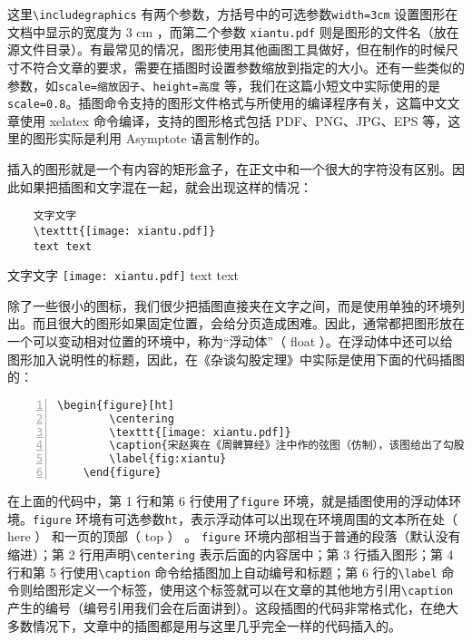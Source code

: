 这里\verb|\includegraphics| 有两个参数，方括号中的可选参数\verb|width=3cm| 设置图形在文档中显示的宽度为 3 cm ，而第二个参数 \verb|xiantu.pdf| 则是图形的文件名（放在源文件目录）。有最常见的情况，图形使用其他画图工具做好，但在制作的时候尺寸不符合文章的要求，需要在插图时设置参数缩放到指定的大小。还有一些类似的参数，如\verb|scale=缩放因子|、\verb|height=高度| 等，我们在这篇小短文中实际使用的是\verb|scale=0.8|。插图命令支持的图形文件格式与所使用的编译程序有关，这篇中文文章使用 xelatex 命令编译，支持的图形格式包括 PDF、PNG、JPG、EPS 等，这里的图形实际是利用 Asymptote 语言制作的。

插入的图形就是一个有内容的矩形盒子，在正文中和一个很大的字符没有区别。因此如果把插图和文字混在一起，就会出现这样的情况：

\begin{minipage}[t]{0.45\textwidth}
    \begin{lstlisting}
    文字文字
    \texttt{[image: xiantu.pdf]}
    text text
    \end{lstlisting}
\end{minipage}
\hfill
\begin{minipage}[c]{0.45\textwidth}
    \vspace{0.1cm}
    \hspace{2.5cm}
    文字文字
    \texttt{[image: xiantu.pdf]}
    text text
\end{minipage}

除了一些很小的图标，我们很少把插图直接夹在文字之间，而是使用单独的环境列出。而且很大的图形如果固定位置，会给分页造成困难。因此，通常都把图形放在一个可以变动相对位置的环境中，称为“浮动体”（ float ）。在浮动体中还可以给图形加入说明性的标题，因此，在《杂谈勾股定理》中实际是使用下面的代码插图的：
\begin{lstlisting}[numbers=left]
    \begin{figure}[ht]
        \centering
        \texttt{[image: xiantu.pdf]}
        \caption{宋赵爽在《周髀算经》注中作的弦图（仿制），该图给出了勾股定理的一个极具对称美的证明。}
        \label{fig:xiantu}
    \end{figure}
\end{lstlisting}

在上面的代码中，第 1 行和第 6 行使用了\verb|figure| 环境，就是插图使用的浮动体环境。\verb|figure| 环境有可选参数\verb|ht|，表示浮动体可以出现在环境周围的文本所在处（ here ） 和一页的顶部（ top ） 。 \verb|figure| 环境内部相当于普通的段落（默认没有缩进）；第 2 行用声明\verb|\centering| 表示后面的内容居中；第 3 行插入图形；第 4 行和第 5 行使用\verb|\caption| 命令给插图加上自动编号和标题；第 6 行的\verb|\label| 命令则给图形定义一个标签，使用这个标签就可以在文章的其他地方引用\verb|\caption| 产生的编号（编号引用我们会在后面讲到）。这段插图的代码非常格式化，在绝大多数情况下，文章中的插图都是用与这里几乎完全一样的代码插入的。

